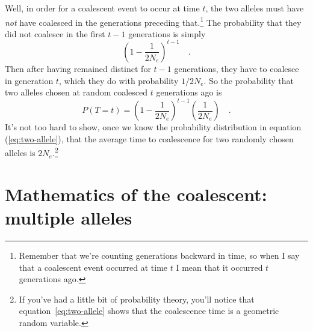 Well, in order for a coalescent event to occur at time $t$, the two
alleles must have {\it not\/} have coalesced in the generations
preceding that.\footnote{Remember that we're counting generations
  backward in time, so when I say that a coalescent event occurred at
  time $t$ I mean that it occurred $t$ generations ago.} The
probability that they did not coalesce in the first $t-1$ generations
is simply
\[
\left(1 - \frac{1}{2N_e}\right)^{t-1} \quad .
\]
Then after having remained distinct for $t-1$ generations, they have
to coalesce in generation $t$, which they do with probability
$1/2N_e$. So the probability that two alleles chosen at random
coalesced $t$ generations ago is
\begin{equation}
P(T=t) = \left(1 -
\frac{1}{2N_e}\right)^{t-1}\left(\frac{1}{2N_e}\right) \quad .
\label{eq:two-allele}
\end{equation}
It's not too hard to show, once we know the probability distribution
in equation (\ref{eq:two-allele}), that the average time to
coalescence for two randomly chosen alleles is $2N_e$.\footnote{If
  you've had a little bit of probability theory, you'll notice that
  equation~\ref{eq:two-allele} shows that the coalescence time is a
  geometric random variable.}

\section*{Mathematics of the coalescent: multiple
  alleles}

